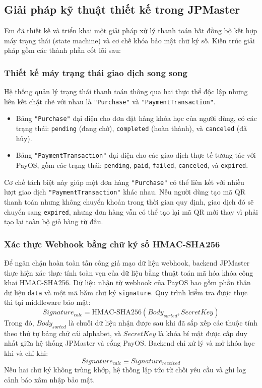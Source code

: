 \documentclass[../DoAn.tex]{subfiles}
\begin{document}
\subsection{Giải pháp kỹ thuật thiết kế trong JPMaster}
Em đã thiết kế và triển khai một giải pháp xử lý thanh toán bất đồng bộ kết hợp máy trạng thái (state machine) và cơ chế khóa bảo mật chữ ký số. Kiến trúc giải pháp gồm các thành phần cốt lõi sau:

\subsubsection{Thiết kế máy trạng thái giao dịch song song}
Hệ thống quản lý trạng thái thanh toán thông qua hai thực thể độc lập nhưng liên kết chặt chẽ với nhau là \texttt{"Purchase"} và \texttt{"PaymentTransaction"}.
\begin{itemize}
    \item Bảng \texttt{"Purchase"} đại diện cho đơn đặt hàng khóa học của người dùng, có các trạng thái: \texttt{pending} (đang chờ), \texttt{completed} (hoàn thành), và \texttt{canceled} (đã hủy).
    \item Bảng \texttt{"PaymentTransaction"} đại diện cho các giao dịch thực tế tương tác với PayOS, gồm các trạng thái: \texttt{pending}, \texttt{paid}, \texttt{failed}, \texttt{canceled}, và \texttt{expired}.
\end{itemize}
Cơ chế tách biệt này giúp một đơn hàng \texttt{"Purchase"} có thể liên kết với nhiều lượt giao dịch \texttt{"PaymentTransaction"} khác nhau. Nếu người dùng tạo mã QR thanh toán nhưng không chuyển khoản trong thời gian quy định, giao dịch đó sẽ chuyển sang \texttt{expired}, nhưng đơn hàng vẫn có thể tạo lại mã QR mới thay vì phải tạo lại toàn bộ giỏ hàng từ đầu.

\subsubsection{Xác thực Webhook bằng chữ ký số HMAC-SHA256}
Để ngăn chặn hoàn toàn tấn công giả mạo dữ liệu webhook, backend JPMaster thực hiện xác thực tính toàn vẹn của dữ liệu bằng thuật toán mã hóa khóa công khai HMAC-SHA256. Dữ liệu nhận từ webhook của PayOS bao gồm phần thân dữ liệu \texttt{data} và một mã băm chữ ký \texttt{signature}. Quy trình kiểm tra được thực thi tại middleware bảo mật:
\begin{equation}
    Signature_{calc} = \text{HMAC-SHA256}(Body_{sorted}, SecretKey)
\end{equation}
Trong đó, $Body_{sorted}$ là chuỗi dữ liệu nhận được sau khi đã sắp xếp các thuộc tính theo thứ tự bảng chữ cái alphabet, và $SecretKey$ là khóa bí mật được cấp duy nhất giữa hệ thống JPMaster và cổng PayOS. Backend chỉ xử lý và mở khóa học khi và chỉ khi:
\begin{equation}
    Signature_{calc} \equiv Signature_{received}
\end{equation}
Nếu hai chữ ký không trùng khớp, hệ thống lập tức từ chối yêu cầu và ghi log cảnh báo xâm nhập bảo mật.
\end{document}
